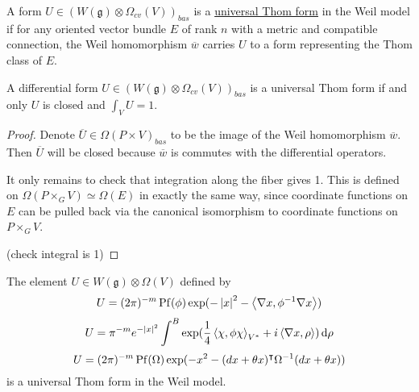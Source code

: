\begin{defn} 
	A form $U\in (W(\mathfrak{g})\otimes \Omega_{cv}(V))_{bas}$ is a
	\underline{universal Thom form} in the Weil model if for any oriented vector
	bundle $E$ of rank $n$ with a metric and compatible connection, the 
	Weil homomorphism $\overline{w}$ carries $U$ to a form representing the Thom class of $E$.
\end{defn} 

\begin{prop} 
	A differential form $U\in (W(\mathfrak{g})\otimes \Omega_{cv}(V))_{bas}$ is a 
	universal Thom form if and only $U$ is closed and  $\int_V U = 1$.
\end{prop}
\begin{proof}
	Denote $\overline{U}\in \Omega(P\times V)_{bas}$ to be the image of the
	Weil homomorphism $\overline{w}$. Then $\overline{U}$ will be closed because
	$\overline{w}$ is commutes with the differential operators. 

	It only remains to check that integration along the fiber gives 1. 
	This is defined on $\Omega(P\times_G V)\simeq \Omega(E)$ in exactly the same
	way, since coordinate functions on $E$ can be pulled back via the canonical
	isomorphism to coordinate functions on $P\times_G V$. 
	\begin{comment}
	Recall that a local trivialisation 
	$\phi_\alpha : E|_{U_\alpha} \to U_\alpha \times
	\mathbb{R}^n$ gives coordinate functions $[t_1\cdots t_n] = p_2\phi_\alpha
	\in \mathbb{R}^n$ where $p_2$ is the projection on to $\mathbb{R}^n$.  
	This can be identified with coordinate functions on the associated bundle
	$[x_1\cdots]$
	\end{comment}
	(check integral is 1)
\end{proof}

\begin{prop} \label{prop:universal_Thom}
	The element $U \in W(\mathfrak{g}) \otimes \Omega(V)$ defined by  
	\[%
		U = (2\pi)^{-m} \Pf(\phi) \exp(-\abs{x}^2-\gen{\nabla x,\phi^{-1}\nabla x})
	\] 
	\[ %
	U = \pi^{-m} e^{-\abs{x}^2}
	\int^B\exp(\frac{1}{4}\gen{\chi,\phi\chi}_{V^*}+i\gen{\nabla x, \rho})
	\odif{\rho}	
	\]
	\[%
	U = (2\pi)^{-m}\Pf(\Omega) \exp(-x^2-(dx+\theta x)^\intercal \Omega^{-1}
	(dx+\theta x))
	\] 
	is a universal Thom form in the Weil model.	
\end{prop}
	
